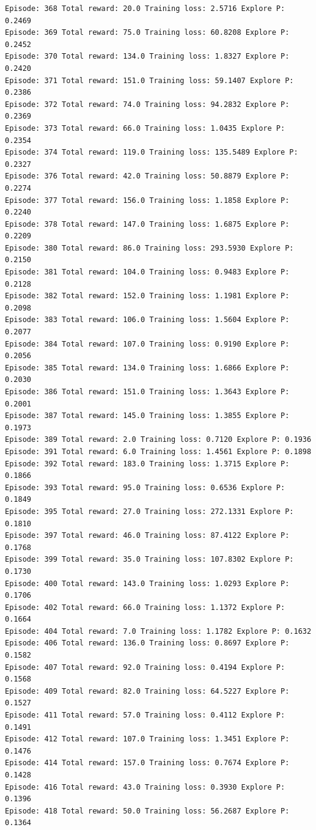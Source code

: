 \documentclass[11pt]{article}
\begin{document}
\begin{Verbatim}[commandchars=\\\{\}]
Episode: 368 Total reward: 20.0 Training loss: 2.5716 Explore P: 0.2469
Episode: 369 Total reward: 75.0 Training loss: 60.8208 Explore P: 0.2452
Episode: 370 Total reward: 134.0 Training loss: 1.8327 Explore P: 0.2420
Episode: 371 Total reward: 151.0 Training loss: 59.1407 Explore P: 0.2386
Episode: 372 Total reward: 74.0 Training loss: 94.2832 Explore P: 0.2369
Episode: 373 Total reward: 66.0 Training loss: 1.0435 Explore P: 0.2354
Episode: 374 Total reward: 119.0 Training loss: 135.5489 Explore P: 0.2327
Episode: 376 Total reward: 42.0 Training loss: 50.8879 Explore P: 0.2274
Episode: 377 Total reward: 156.0 Training loss: 1.1858 Explore P: 0.2240
Episode: 378 Total reward: 147.0 Training loss: 1.6875 Explore P: 0.2209
Episode: 380 Total reward: 86.0 Training loss: 293.5930 Explore P: 0.2150
Episode: 381 Total reward: 104.0 Training loss: 0.9483 Explore P: 0.2128
Episode: 382 Total reward: 152.0 Training loss: 1.1981 Explore P: 0.2098
Episode: 383 Total reward: 106.0 Training loss: 1.5604 Explore P: 0.2077
Episode: 384 Total reward: 107.0 Training loss: 0.9190 Explore P: 0.2056
Episode: 385 Total reward: 134.0 Training loss: 1.6866 Explore P: 0.2030
Episode: 386 Total reward: 151.0 Training loss: 1.3643 Explore P: 0.2001
Episode: 387 Total reward: 145.0 Training loss: 1.3855 Explore P: 0.1973
Episode: 389 Total reward: 2.0 Training loss: 0.7120 Explore P: 0.1936
Episode: 391 Total reward: 6.0 Training loss: 1.4561 Explore P: 0.1898
Episode: 392 Total reward: 183.0 Training loss: 1.3715 Explore P: 0.1866
Episode: 393 Total reward: 95.0 Training loss: 0.6536 Explore P: 0.1849
Episode: 395 Total reward: 27.0 Training loss: 272.1331 Explore P: 0.1810
Episode: 397 Total reward: 46.0 Training loss: 87.4122 Explore P: 0.1768
Episode: 399 Total reward: 35.0 Training loss: 107.8302 Explore P: 0.1730
Episode: 400 Total reward: 143.0 Training loss: 1.0293 Explore P: 0.1706
Episode: 402 Total reward: 66.0 Training loss: 1.1372 Explore P: 0.1664
Episode: 404 Total reward: 7.0 Training loss: 1.1782 Explore P: 0.1632
Episode: 406 Total reward: 136.0 Training loss: 0.8697 Explore P: 0.1582
Episode: 407 Total reward: 92.0 Training loss: 0.4194 Explore P: 0.1568
Episode: 409 Total reward: 82.0 Training loss: 64.5227 Explore P: 0.1527
Episode: 411 Total reward: 57.0 Training loss: 0.4112 Explore P: 0.1491
Episode: 412 Total reward: 107.0 Training loss: 1.3451 Explore P: 0.1476
Episode: 414 Total reward: 157.0 Training loss: 0.7674 Explore P: 0.1428
Episode: 416 Total reward: 43.0 Training loss: 0.3930 Explore P: 0.1396
Episode: 418 Total reward: 50.0 Training loss: 56.2687 Explore P: 0.1364

\end{Verbatim}
\end{document}
